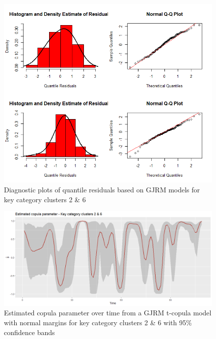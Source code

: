 


\begin{figure}[H]
\centering
  \includegraphics[width=0.95\linewidth]{figures/res_hist_qqplot_26.png}
  \caption{Diagnostic plots of quantile residuals based on \ac{GJRM} models for key category clusters 2 \& 6}
  \label{fig:res_hist_qqplot_26}
\end{figure}


\begin{figure}[H]
\centering
  \includegraphics[width=0.95\linewidth]{figures/estimated_theta_kcc_26.png}
  \caption{Estimated copula parameter over time from a \ac{GJRM} t-copula model with normal margins for key category clusters 2 \& 6 with 95\% confidence bands}
  \label{fig:estimated_theta_kcc_26}
\end{figure}

